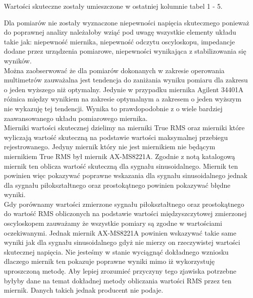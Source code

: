 \documentclass[11pt]{article}
\begin{document}
    \noindent Wartości skuteczne zostały umieszczone w ostatniej kolumnie tabel 1 - 5.\\
    \par Dla pomiarów nie zostały wyznaczone niepewności napięcia skutecznego ponieważ do poprawnej analizy należałoby wziąć pod uwagę wszystkie elementy układu takie jak:
    niepewność miernika, niepewność odczytu oscyloskopu, impedancje dodane przez urządzenia pomiarowe, niepewności wynikająca z stabilizowania się wyników.\\
    \indent Można zaobserwować że dla pomiarów dokonanych w zakresie operowania multimetrów zauważalna jest tendencja do zaniżania wyniku pomiaru dla zakresu o jeden wyższego niż optymalny.
    Jedynie w przypadku miernika Agilent 34401A różnica między wynikiem na zakresie optymalnym a zakresem o jeden wyższym nie wykazuję tej tendencji. Wynika to prawdopodobnie z o
    wiele bardziej zaawansowanego układu pomiarowego miernika.\\
    \indent Mierniki wartości skutecznej dzielimy na mierniki True RMS oraz mierniki które wyliczają wartość skuteczną na podstawie wartości maksymalnej przebiegu rejestrowanego.
    Jedyny miernik który nie jest miernikiem nie będącym miernikiem True RMS był miernik AX-MS8221A. Zgodnie z notą katalogową miernik ten oblicza wartość skuteczną dla sygnału
    sinusoidalnego. Miernik ten powinien więc pokazywać poprawne wskazania dla sygnału sinusoidalnego jednak dla sygnału piłokształtnego oraz prostokątnego powinien pokazywać
    błędne wyniki.\\
    \indent Gdy porównamy wartości zmierzone sygnału piłokształtnego oraz prostokątnego do wartość RMS obliczonych na podstawie wartości międzyszczytowej zmierzonej oscyloskopem zauważamy
    że wszystkie pomiary są zgodne w wartościami oczekiwanymi. Jednak miernik AX-MS8221A powinien wskazywać takie same wyniki jak dla sygnału sinusoidalnego gdyż nie mierzy on rzeczywistej
    wartości skutecznej napięcia. Nie jesteśmy w stanie wyciągnąć dokładnego wzniosku dlaczego miernik ten pokazuje poprawne wyniki mimo iż wykorzystuję uproszczoną metodę. Aby lepiej
    zrozumieć przyczyny tego zjawiska potrzebne byłyby dane na temat dokładnej metody obliczania wartości RMS przez ten miernik. Danych takich jednak producent nie podaje.
    \newpage
\end{document}
